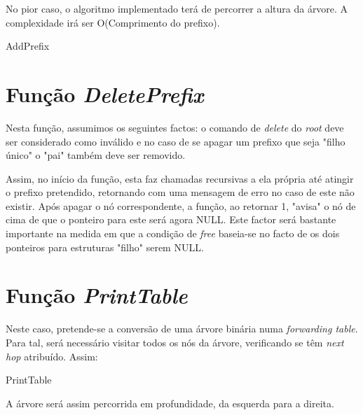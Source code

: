\documentclass[a4paper]{article}
\begin{document}
No pior caso, o algoritmo implementado terá de percorrer a altura da árvore. A complexidade irá ser O(Comprimento do prefixo).

\begin{algorithm}[H]
 \caption{AddPrefix}
\end{algorithm}

\section{Função \textit{DeletePrefix}}
Nesta função, assumimos os seguintes factos: o comando de \textit{delete} do \textit{root} deve ser considerado como inválido e no caso de se apagar um prefixo que seja "filho único" o "pai" também deve ser removido.

Assim, no início da função, esta faz chamadas recursivas a ela própria até atingir o prefixo pretendido, retornando com uma mensagem de erro no caso de este não existir. Após apagar o nó correspondente, a função, ao retornar 1, "avisa" o nó de cima de que o ponteiro para este será agora NULL. Este factor será bastante importante na medida em que a condição de \textit{free} baseia-se no facto de os dois ponteiros para estruturas "filho" serem NULL.
\section{Função \textit{PrintTable}}
Neste caso, pretende-se a conversão de uma árvore binária numa \textit{forwarding table}. Para tal, será necessário visitar todos os nós da árvore, verificando se têm \textit{next hop} atribuído. Assim:

\begin{algorithm}[H]
 \Return\;
 \caption{PrintTable}
\end{algorithm}
A árvore será assim percorrida em profundidade, da esquerda para a direita.
\end{document}
